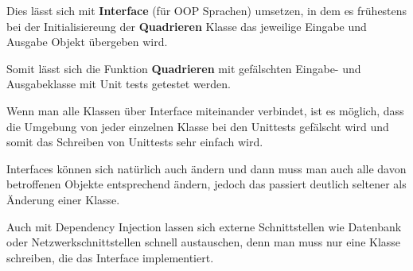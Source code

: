 Dies lässt sich mit \textbf{Interface} (für OOP Sprachen) umsetzen, 
in dem es frühestens bei der Initialisiereung der \textbf{Quadrieren} 
Klasse das jeweilige Eingabe und Ausgabe Objekt übergeben wird.

Somit lässt sich die Funktion \textbf{Quadrieren} mit gefälschten Eingabe- und Ausgabeklasse mit Unit tests getestet werden.

Wenn man alle Klassen über Interface miteinander verbindet, 
ist es möglich, dass die Umgebung von jeder einzelnen Klasse bei den Unittests gefälscht
wird und somit das Schreiben von Unittests sehr einfach wird. 

Interfaces können sich natürlich auch ändern und dann muss man auch alle davon betroffenen Objekte entsprechend ändern, 
jedoch das passiert deutlich seltener als Änderung einer Klasse.

Auch mit Dependency Injection lassen sich externe Schnittstellen wie Datenbank oder Netzwerkschnittstellen schnell austauschen, 
denn man muss nur eine Klasse schreiben, die das Interface implementiert.